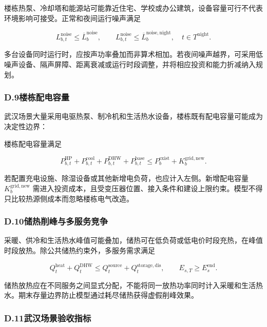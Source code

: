 楼栋热泵、冷却塔和能源站可能靠近住宅、学校或办公建筑，设备容量可行不代表环境影响可接受。正常和夜间运行噪声满足

\begin{equation}
L_{b,t}^{\mathrm{noise}}\leq\overline L_b^{\mathrm{noise}},
\qquad
L_{b,t}^{\mathrm{noise}}\leq\overline L_b^{\mathrm{noise,night}},
\quad t\in T^{\mathrm{night}}.
\label{eq:wuhan_noise}
\end{equation}

多台设备同时运行时，应按声功率叠加而非算术相加。若夜间噪声越界，可采用低噪声设备、隔声屏障、距离衰减或运行时段调整，并将相应投资和能力折减纳入规划。

\subsubsection*{D.9\quad 楼栋配电容量}

武汉场景大量采用电驱热泵、制冷机和生活热水设备，楼栋既有配电容量可能成为决定性边界：

楼栋配电容量满足

\begin{equation}
P_{b,t}^{\mathrm{HP}}+P_{b,t}^{\mathrm{cool}}+P_{b,t}^{\mathrm{DHW}}+P_{b,t}^{\mathrm{base}}
\leq P_b^{\mathrm{exist}}+K_b^{\mathrm{grid,new}}.
\label{eq:wuhan_grid}
\end{equation}

若配置充电设施、除湿设备或其他新增电负荷，也应计入左侧。新增配电容量 $K_b^{\mathrm{grid,new}}$ 需进入投资成本，且受变压器位置、接入条件和建设上限约束。模型不得只比较热源侧成本而忽略楼栋电气改造。

\subsubsection*{D.10\quad 储热削峰与多服务竞争}

采暖、供冷和生活热水峰值可能叠加，储热可在低负荷或低电价时段充热，在峰值时段放热。除公共储热约束外，多服务需求满足

\begin{equation}
Q_t^{\mathrm{heat}}+Q_t^{\mathrm{DHW}}
\leq Q_t^{\mathrm{source}}+Q_t^{\mathrm{storage,dis}},
\qquad
E_{s,T}\geq E_s^{\mathrm{end}}.
\label{eq:wuhan_storage_peak}
\end{equation}

储热放热应在不同服务之间显式分配，不能将同一放热功率同时计入采暖和生活热水。期末存量边界防止模型通过耗尽储热获得虚假削峰效果。

\subsubsection*{D.11\quad 武汉场景验收指标}

